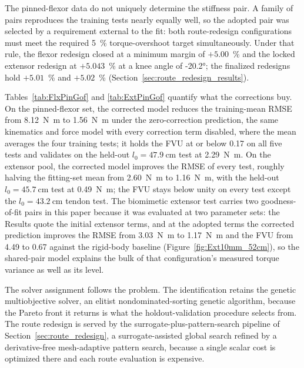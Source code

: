 The pinned-flexor data do not uniquely determine the stiffness pair. A family of pairs reproduces the training tests nearly equally well, so the adopted pair was selected by a requirement external to the fit: both route-redesign configurations must meet the required \qty{5}{\percent} torque-overshoot target simultaneously. Under that rule, the flexor redesign closed at a minimum margin of $+5.00$~\% and the locked extensor redesign at $+5.043$~\% at a knee angle of \ang{-20.2}; the finalized redesigns hold $+5.01$~\% and $+5.02$~\% (Section~\ref{sec:route_redesign_results}).

Tables~\ref{tab:FlxPinGof} and \ref{tab:ExtPinGof} quantify what the corrections buy. On the pinned-flexor set, the corrected model reduces the training-mean RMSE from \qty{8.12}{\newton\meter} to \qty{1.56}{\newton\meter} under the zero-correction prediction, the same kinematics and force model with every correction term disabled, where the mean averages the four training tests; it holds the FVU at or below 0.17 on all five tests and validates on the held-out $l_{0}=\qty{47.9}{\cm}$ test at \qty{2.29}{\newton\meter}. On the extensor pool, the corrected model improves the RMSE of every test, roughly halving the fitting-set mean from \qty{2.60}{\newton\meter} to \qty{1.16}{\newton\meter}, with the held-out $l_{0}=\qty{45.7}{\cm}$ test at \qty{0.49}{\newton\meter}; the FVU stays below unity on every test except the $l_{0}=\qty{43.2}{\cm}$ tendon test. The biomimetic extensor test carries two goodness-of-fit pairs in this paper because it was evaluated at two parameter sets: the Results quote the initial extensor terms, and at the adopted terms the corrected prediction improves the RMSE from \qty{3.03}{\newton\meter} to \qty{1.17}{\newton\meter} and the FVU from 4.49 to 0.67 against the rigid-body baseline (Figure~\ref{fig:Ext10mm_52cm}), so the shared-pair model explains the bulk of that configuration's measured torque variance as well as its level.

The solver assignment follows the problem. The identification retains the genetic multiobjective solver, an elitist nondominated-sorting genetic algorithm, because the Pareto front it returns is what the holdout-validation procedure selects from. The route redesign is served by the surrogate-plus-pattern-search pipeline of Section~\ref{sec:route_redesign}, a surrogate-assisted global search refined by a derivative-free mesh-adaptive pattern search, because a single scalar cost is optimized there and each route evaluation is expensive.

